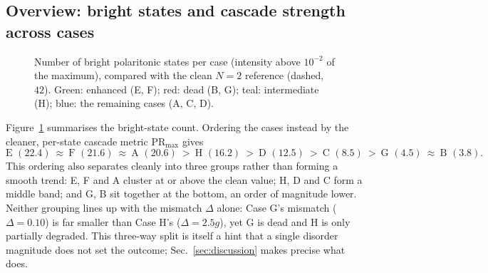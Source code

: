 \documentclass[12pt,a4paper]{article}
\newcommand{\PR}{\mathrm{PR}}
\begin{document}
\subsection{Overview: bright states and cascade strength across cases}

\begin{figure}[htbp]
\centering
{}
\caption{Number of bright polaritonic states per case (intensity above
$10^{-2}$ of the maximum), compared with the clean $N=2$ reference (dashed,
$42$). Green: enhanced (E, F); red: dead (B, G); teal: intermediate (H);
blue: the remaining cases (A, C, D).}
\label{fig:bright}
\end{figure}
\FloatBarrier

Figure~\ref{fig:bright} summarises the bright-state count. Ordering the cases
instead by the cleaner, per-state cascade metric $\PR_{\max}$ gives
\begin{equation*}
  \text{E }(22.4)\ \approx\ \text{F }(21.6)\ \approx\ \text{A }(20.6)
  \ >\ \text{H }(16.2)\ >\ \text{D }(12.5)\ >\ \text{C }(8.5)
  \ >\ \text{G }(4.5)\ \approx\ \text{B }(3.8).
\end{equation*}
This ordering also separates cleanly into three groups rather than forming a
smooth trend: E, F and A cluster at or above the clean value; H, D and C form
a middle band; and G, B sit together at the bottom, an order of magnitude
lower. Neither grouping lines up with the mismatch $\Delta$ alone: Case G's
mismatch ($\Delta=0.10$) is far smaller than Case H's ($\Delta=2.5g$), yet G
is dead and H is only partially degraded. This three-way split is itself a
hint that a single
disorder magnitude does not set the outcome; Sec.~\ref{sec:discussion} makes
precise what does.
\end{document}
